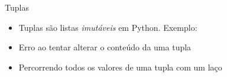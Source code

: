\begin{frame}{Tuplas}
  \begin{itemize}
    \item Tuplas são listas {\it imutáveis } em Python. Exemplo:
      
    \item Erro ao tentar alterar o conteúdo da uma tupla
      
    \item Percorrendo todos os valores de uma tupla com um laço
      
  \end{itemize}  
\end{frame}
%




 